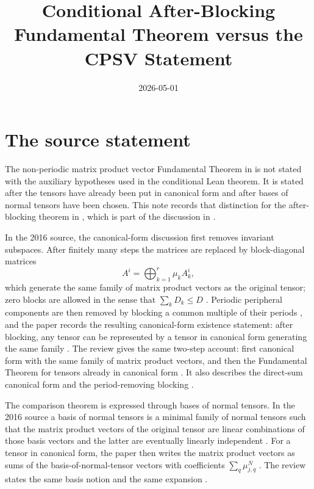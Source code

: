 \documentclass{article}
\title{Conditional After-Blocking Fundamental Theorem versus the CPSV Statement}
\author{}
\date{2026-05-01}
\begin{document}
\maketitle

\section{The source statement}

The non-periodic matrix product vector Fundamental Theorem in
\cite{Cirac2016MPDO_arXiv,Cirac2017MPDO_AnnPhys,Cirac2021Matrix} is not stated
with the auxiliary hypotheses used in the conditional Lean theorem. It is stated
after the tensors have already been put in canonical form and after bases of
normal tensors have been chosen. This note records that distinction for the
after-blocking theorem in , which is part of the discussion in
.

In the 2016 source, the canonical-form discussion first removes invariant
subspaces. After finitely many steps the matrices are replaced by block-diagonal
matrices
\[
  A^i = \bigoplus_{k=1}^r \mu_k A_k^i,
\]
which generate the same family of matrix product vectors as the original tensor;
zero blocks are allowed in the sense that $\sum_k D_k\le D$
\cite[lines~214--219]{Cirac2016MPDO_arXiv}. Periodic peripheral components are
then removed by blocking a common multiple of their periods
\cite[lines~227--231]{Cirac2016MPDO_arXiv}, and the paper records the resulting
canonical-form existence statement: after blocking, any tensor can be represented
by a tensor in canonical form generating the same family
\cite[lines~249--251]{Cirac2016MPDO_arXiv}. The review gives the same two-step
account: first canonical form with the same family of matrix product vectors, and
then the Fundamental Theorem for tensors already in canonical form
\cite[lines~1752--1758]{Cirac2021Matrix}. It also describes the direct-sum
canonical form and the period-removing blocking
\cite[lines~1798--1820]{Cirac2021Matrix}.

The comparison theorem is expressed through bases of normal tensors. In the
2016 source a basis of normal tensors is a minimal family of normal tensors such
that the matrix product vectors of the original tensor are linear combinations of
those basis vectors and the latter are eventually linearly independent
\cite[lines~271--280]{Cirac2016MPDO_arXiv}. For a tensor in canonical form, the
paper then writes the matrix product vectors as sums of the basis-of-normal-tensor
vectors with coefficients $\sum_q \mu_{j,q}^N$
\cite[lines~283--302]{Cirac2016MPDO_arXiv}. The review states the same basis
notion and the same expansion
\cite[lines~1846--1885]{Cirac2021Matrix}.
\end{document}
